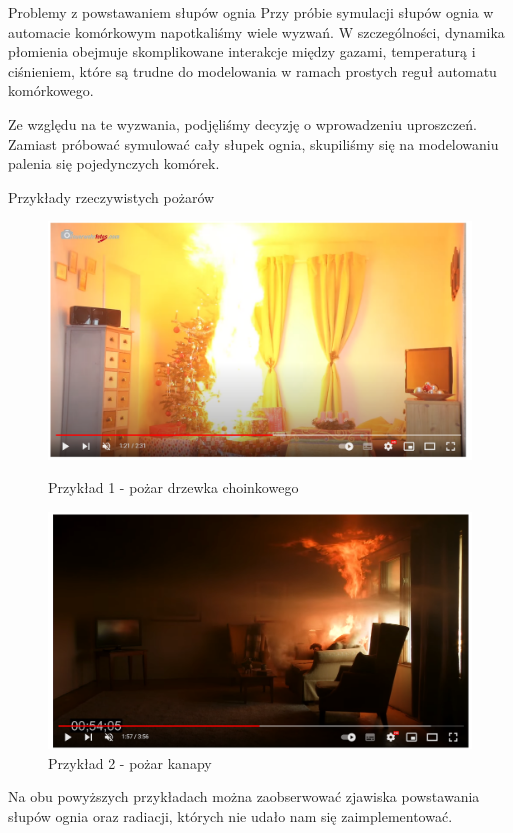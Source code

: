 \documentclass{beamer}
\begin{document}
\begin{frame}{Problemy z powstawaniem słupów ognia}
    Przy próbie symulacji słupów ognia w automacie komórkowym napotkaliśmy wiele wyzwań. W szczególności, dynamika płomienia obejmuje skomplikowane interakcje między gazami, temperaturą i ciśnieniem, które są trudne do modelowania w ramach prostych reguł automatu komórkowego.

    Ze względu na te wyzwania, podjęliśmy decyzję o wprowadzeniu uproszczeń. Zamiast próbować symulować cały słupek ognia, skupiliśmy się na modelowaniu palenia się pojedynczych komórek.
\end{frame}

\begin{frame}{Przykłady rzeczywistych pożarów}
\begin{figure}[htbp]
  \centering
  \begin{minipage}{.45\textwidth}
    \includegraphics[width=\textwidth]{1.png}
    \caption{Przykład 1 - pożar drzewka choinkowego}
    \label{fig:image1}
  \end{minipage}%
  \hfill
  \begin{minipage}{.45\textwidth}
    \includegraphics[width=\textwidth]{2.png}
    \caption{Przykład 2 - pożar kanapy}
    \label{fig:image2}
  \end{minipage}
\end{figure}

Na obu powyższych przykładach można zaobserwować zjawiska powstawania słupów ognia oraz radiacji, których nie udało nam się zaimplementować.
\end{frame}
\end{document}
